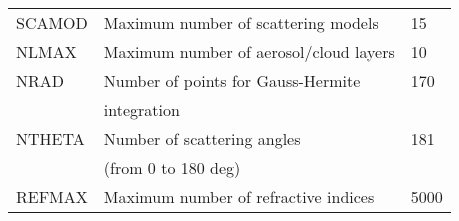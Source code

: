 \begin{table*}[!h]
\begin{tabular}{|l|l|l|}
SCAMOD   & Maximum number of scattering models           & 15 \\
NLMAX    & Maximum number of aerosol/cloud layers        & 10 \\
NRAD     & Number of points for Gauss-Hermite            & 170 \\
         & integration                                   & \\
NTHETA   & Number of scattering angles                   & 181 \\
         & (from 0 to 180 deg)                           & \\
REFMAX   & Maximum number of refractive indices          & 5000 \\
\hline
\end{tabular}
\end{table*} 



